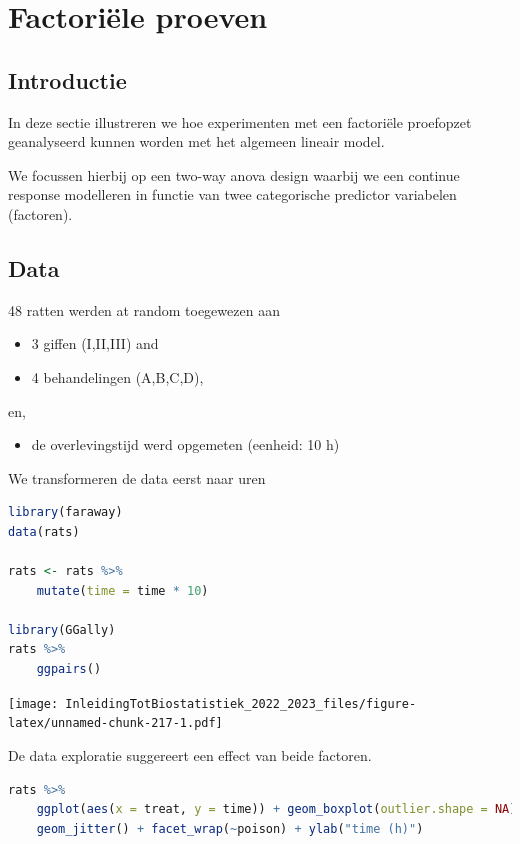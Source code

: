 \documentclass[
  12pt,dutch,coursenotes]{book}
\providecommand{\tightlist}{%
  \setlength{\itemsep}{0pt}\setlength{\parskip}{0pt}}
\begin{document}
\hypertarget{factoriuxeble-proeven}{%
\section{Factoriële proeven}\label{factoriuxeble-proeven}}

\hypertarget{introductie}{%
\subsection{Introductie}\label{introductie}}

In deze sectie illustreren we hoe experimenten met een factoriële proefopzet geanalyseerd kunnen worden met het algemeen lineair model.

We focussen hierbij op een two-way anova design waarbij we een continue response modelleren in functie van twee categorische predictor variabelen (factoren).

\hypertarget{data-2}{%
\subsection{Data}\label{data-2}}

48 ratten werden at random toegewezen aan

\begin{itemize}
\tightlist
\item
  3 giffen (I,II,III) and
\item
  4 behandelingen (A,B,C,D),
\end{itemize}

en,

\begin{itemize}
\tightlist
\item
  de overlevingstijd werd opgemeten (eenheid: 10 h)
\end{itemize}

We transformeren de data eerst naar uren

\begin{lstlisting}[language=R]
library(faraway)
data(rats)

rats <- rats %>%
    mutate(time = time * 10)

library(GGally)
rats %>%
    ggpairs()
\end{lstlisting}

\texttt{[image: InleidingTotBiostatistiek\_2022\_2023\_files/figure-latex/unnamed-chunk-217-1.pdf]}

De data exploratie suggereert een effect van beide factoren.

\begin{lstlisting}[language=R]
rats %>%
    ggplot(aes(x = treat, y = time)) + geom_boxplot(outlier.shape = NA) +
    geom_jitter() + facet_wrap(~poison) + ylab("time (h)")
\end{lstlisting}
\end{document}
